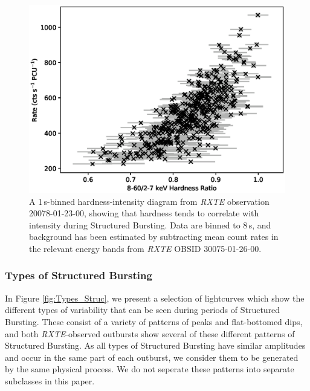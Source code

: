 \begin{figure}
  \centering
  \includegraphics[width=.9\linewidth, trim={0.4cm 0 1.cm 0},clip]{images/struc_hard.eps}
  \caption{\small A 1\,s-binned hardness-intensity diagram from \textit{RXTE} observation 20078-01-23-00, showing that hardness tends to correlate with intensity during Structured Bursting.  Data are binned to 8\,s, and background has been estimated by subtracting mean count rates in the relevant energy bands from \textit{RXTE} OBSID 30075-01-26-00.}
  \label{fig:struc_hard}
\end{figure}

\subsubsection{Types of Structured Bursting}
\label{sec:struc_var}

\par In Figure \ref{fig:Types_Struc}, we present a selection of lightcurves which show the different types of variability that can be seen during periods of Structured Bursting.  These consist of a variety of patterns of peaks and flat-bottomed dips, and both \textit{RXTE}-observed outbursts show several of these different patterns of Structured Bursting.  As all types of Structured Bursting have similar amplitudes and occur in the same part of each outburst, we consider them to be generated by the same physical process.  We do not seperate these patterns into separate subclasses in this paper.

